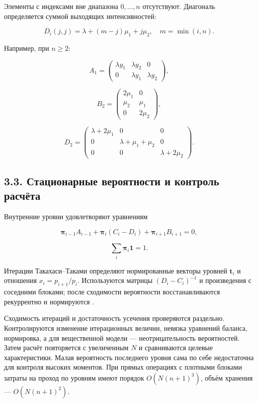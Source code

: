 Элементы с индексами вне диапазона \(0,\ldots,n\) отсутствуют. Диагональ определяется суммой выходящих интенсивностей:


\[D_i(j,j)=\lambda+(m-j)\mu_1+j\mu_2,\quad m=\min(i,n).\]


Например, при \(n\ge2\):


\[A_1=\begin{pmatrix}\lambda y_1&\lambda y_2&0\\0&\lambda y_1&\lambda y_2\end{pmatrix},\]

\[B_2=\begin{pmatrix}2\mu_1&0\\\mu_2&\mu_1\\0&2\mu_2\end{pmatrix},\]




\[D_2=\begin{pmatrix}\lambda+2\mu_1&0&0\\0&\lambda+\mu_1+\mu_2&0\\0&0&\lambda+2\mu_2\end{pmatrix}.\]



\subsection*{3.3. Стационарные вероятности и контроль расчёта}
Внутренние уровни удовлетворяют уравнениям


\[\boldsymbol\pi_{i-1}A_{i-1}+\boldsymbol\pi_i(C_i-D_i)+\boldsymbol\pi_{i+1}B_{i+1}=0,\]

\[\sum_i\boldsymbol\pi_i\mathbf1=1.\]


Итерации Такахаси--Таками определяют нормированные векторы уровней \(\boldsymbol t_i\) и отношения \(x_i=p_{i+1}/p_i.\) Используются матрицы \((D_i-C_i)^{-1}\) и произведения с соседними блоками; после сходимости вероятности восстанавливаются рекуррентно и нормируются \cite{takahashi1976,ryzhikov2018ru}.

Сходимость итераций и достаточность усечения проверяются раздельно. Контролируются изменение итерационных величин, невязка уравнений баланса, нормировка, а для вещественной модели --- неотрицательность вероятностей. Затем расчёт повторяется с увеличенным \(N\) и сравниваются целевые характеристики. Малая вероятность последнего уровня сама по себе недостаточна для контроля высоких моментов. При прямых операциях с плотными блоками затраты на проход по уровням имеют порядок \(O(N(n+1)^3)\), объём хранения --- \(O(N(n+1)^2).\)


